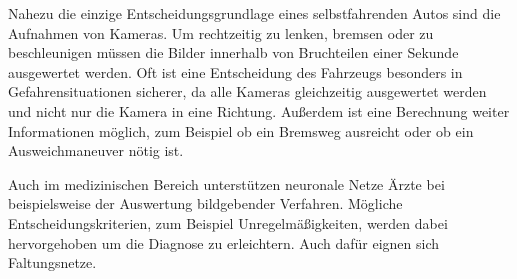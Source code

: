 \documentclass[12pt,a4]{article}
\begin{document}
Nahezu die einzige Entscheidungsgrundlage eines selbstfahrenden Autos sind die Aufnahmen von Kameras. Um rechtzeitig zu lenken, bremsen oder zu beschleunigen müssen die Bilder innerhalb von Bruchteilen einer Sekunde ausgewertet werden. Oft ist eine Entscheidung des Fahrzeugs besonders in Gefahrensituationen sicherer, da alle Kameras gleichzeitig ausgewertet werden und nicht nur die Kamera in eine Richtung. Außerdem ist eine Berechnung weiter Informationen möglich, zum Beispiel ob ein Bremsweg ausreicht oder ob ein Ausweichmaneuver nötig ist.

Auch im medizinischen Bereich unterstützen neuronale Netze Ärzte bei beispielsweise der Auswertung bildgebender Verfahren. Mögliche Entscheidungskriterien, zum Beispiel Unregelmäßigkeiten, werden dabei hervorgehoben um die Diagnose zu erleichtern. Auch dafür eignen sich Faltungsnetze. \cite{HelpInMedicine}



\clearpage
\printindex
\end{document}
